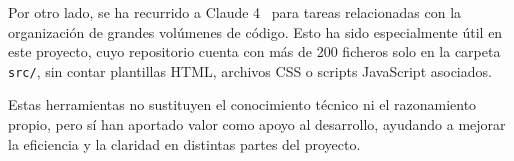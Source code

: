 \documentclass[a4paper, 12pt]{book}
\begin{document}
Por otro lado, se ha recurrido a Claude 4~\cite{claude4} para tareas relacionadas con la organización de grandes volúmenes de código. Esto ha sido especialmente útil en este proyecto, cuyo repositorio cuenta con más de 200 ficheros solo en la carpeta \texttt{src/}, sin contar plantillas HTML, archivos CSS o scripts JavaScript asociados.

Estas herramientas no sustituyen el conocimiento técnico ni el razonamiento propio, pero sí han aportado valor como apoyo al desarrollo, ayudando a mejorar la eficiencia y la claridad en distintas partes del proyecto.



\end{document}
